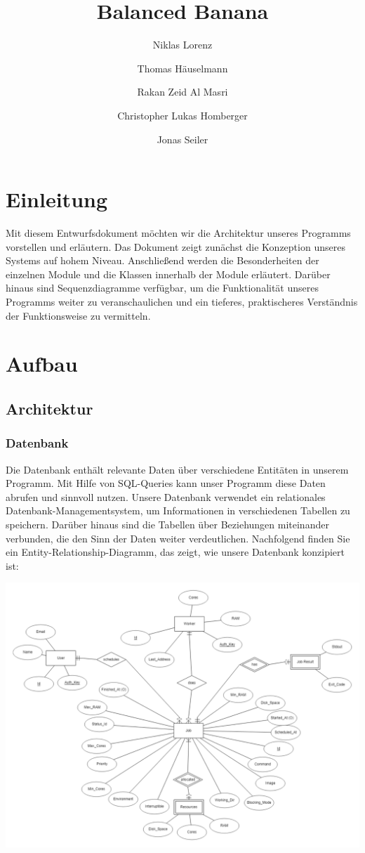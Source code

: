 \documentclass[a4paper,12pt]{article}
\title{Balanced Banana}
\author{Niklas Lorenz \and Thomas Häuselmann \and Rakan Zeid Al Masri \and Christopher Lukas Homberger \and Jonas Seiler}
\begin{document}
\setcounter{page}{2}
\tableofcontents          %
\clearpage
{}

\section{Einleitung}
\vspace{1cm}
Mit diesem Entwurfsdokument möchten wir die Architektur unseres Programms vorstellen und erläutern. Das Dokument zeigt zunächst die Konzeption unseres Systems auf hohem Niveau. Anschließend werden die Besonderheiten der einzelnen Module und die Klassen innerhalb der Module erläutert. Darüber hinaus sind Sequenzdiagramme verfügbar, um die Funktionalität unseres Programms weiter zu veranschaulichen und ein tieferes, praktischeres Verständnis der Funktionsweise zu vermitteln.
\clearpage
\section{Aufbau}

\subsection{Architektur}

\subsubsection{Datenbank}

	Die Datenbank enthält relevante Daten über verschiedene Entitäten in unserem Programm. Mit Hilfe von SQL-Queries kann unser Programm diese Daten abrufen und sinnvoll nutzen.  Unsere Datenbank verwendet ein relationales Datenbank-Managementsystem, um Informationen in verschiedenen Tabellen zu speichern. Darüber hinaus sind die Tabellen über Beziehungen miteinander verbunden, die den Sinn der Daten weiter verdeutlichen. Nachfolgend finden Sie ein Entity-Relationship-Diagramm, das zeigt, wie unsere Datenbank konzipiert ist:

\includegraphics[width=\textwidth]{database_relational}
\end{document}

